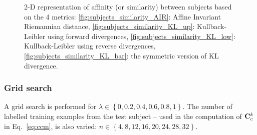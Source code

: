 \begin{figure}[h!]
\caption{2-D representation of affinity (or similarity) between subjects based on the 4 metrics: \ref{fig:subjects_similarity_AIR}: Affine Invariant Riemannian distance, \ref{fig:subjects_similarity_KL_up}: Kullback-Leibler using forward divergences, \ref{fig:subjects_similarity_KL_low}: Kullback-Leibler using reverse divergences, \ref{fig:subjects_similarity_KL_bar}: the symmetric version of KL divergence.}
\end{figure}

\subsubsection{Grid search}

A grid search is performed for $\lambda \in \left\lbrace 0, 0.2, 0.4, 0.6, 0.8, 1 \right\rbrace$.
The number of labelled training examples from the test subject -- used in the computation of $\mathbf{C}_c^k$ in Eq.~\eqref{eq:ccm}, is also varied: $n \in \left\lbrace 4, 8, 12, 16, 20, 24, 28, 32 \right\rbrace $.  

